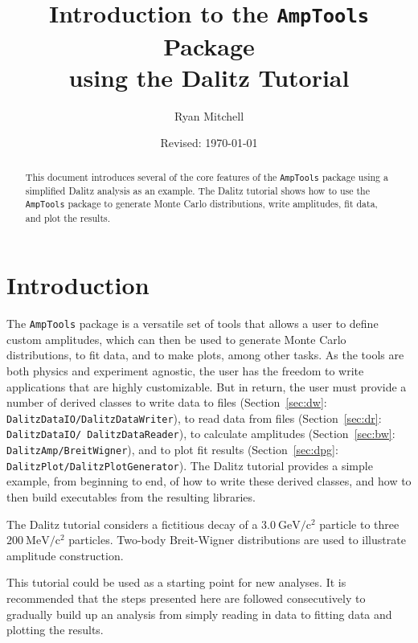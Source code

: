 \documentclass[10pt]{article}
\newcommand{\gevcc}{\mathrm{GeV/c^2}}
\newcommand{\mevcc}{\mathrm{MeV/c^2}}
\begin{document}
\title{Introduction to the {\tt AmpTools} Package\\ using the Dalitz Tutorial}
\author{Ryan Mitchell}
\date{Revised:  \today}
\maketitle 

\begin{abstract}
This document introduces several of the core features of the {\tt AmpTools} package using a simplified Dalitz analysis as an example.  The Dalitz tutorial shows how to use the {\tt AmpTools} package to generate Monte Carlo distributions, write amplitudes, fit data, and plot the results.
\end{abstract}


\tableofcontents

\parindent 0pt
\parskip 10pt


\section{Introduction}

The {\tt AmpTools} package is a versatile set of tools that allows a user to define custom amplitudes, which can then be used to generate Monte Carlo distributions, to fit data, and to make plots, among other tasks.  As the tools are both physics and experiment agnostic, the user has the freedom to write applications that are highly customizable.  But in return, the user must provide a number of derived classes to write data to files (Section~\ref{sec:dw}: {\tt DalitzDataIO/DalitzDataWriter}), to read data from files (Section~\ref{sec:dr}: {\tt DalitzDataIO/ DalitzDataReader}), to calculate amplitudes (Section~\ref{sec:bw}: {\tt DalitzAmp/BreitWigner}), and to plot fit results (Section~\ref{sec:dpg}: {\tt DalitzPlot/DalitzPlotGenerator}).  The Dalitz tutorial provides a simple example, from beginning to end, of how to write these derived classes, and how to then build executables from the resulting libraries.

The Dalitz tutorial considers a fictitious decay of a $3.0~\gevcc$ particle to three $200~\mevcc$ particles.  Two-body Breit-Wigner distributions are used to illustrate amplitude construction.

This tutorial could be used as a starting point for new analyses.  It is recommended that the steps presented here are followed consecutively to gradually build up an analysis from simply reading in data to fitting data and plotting the results.
\end{document}
